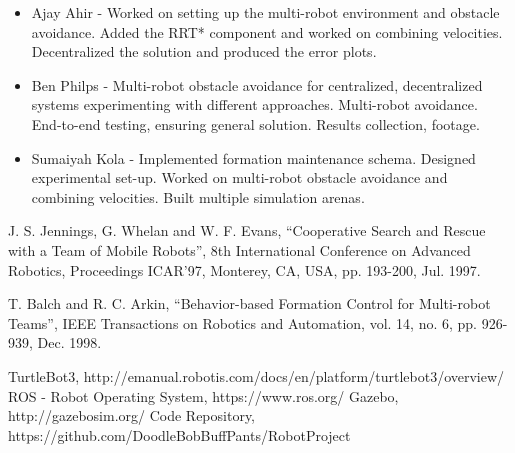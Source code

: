 \documentclass[letterpaper, 10 pt, conference]{ieeeconf}  %
\begin{document}
\begin{itemize}
\item Ajay Ahir - Worked on setting up the multi-robot environment and obstacle avoidance. Added the RRT* component and worked on combining velocities. Decentralized the solution and produced the error plots.

\item Ben Philps - Multi-robot obstacle avoidance for centralized, decentralized systems experimenting with different approaches. Multi-robot avoidance. End-to-end testing, ensuring general solution. Results collection, footage.

\item Sumaiyah Kola - Implemented formation maintenance schema. Designed experimental set-up. Worked on multi-robot obstacle avoidance and combining velocities. Built multiple simulation arenas. 
\end{itemize}

\begin{thebibliography}{99}
	
 J. S. Jennings, G. Whelan and W. F. Evans, ``Cooperative Search and Rescue with a Team of Mobile Robots'', 8th International Conference on Advanced Robotics, Proceedings ICAR'97, Monterey, CA, USA, pp. 193-200, Jul. 1997.

 T. Balch and R. C. Arkin, ``Behavior-based Formation Control for Multi-robot Teams'', IEEE Transactions on Robotics and Automation, vol. 14, no. 6, pp. 926-939, Dec. 1998.

 TurtleBot3, http://emanual.robotis.com/docs/en/platform/turtlebot3/overview/
 ROS - Robot Operating System, https://www.ros.org/
 Gazebo, http://gazebosim.org/
 Code Repository, https://github.com/DoodleBobBuffPants/RobotProject

\end{thebibliography}
\end{document}
